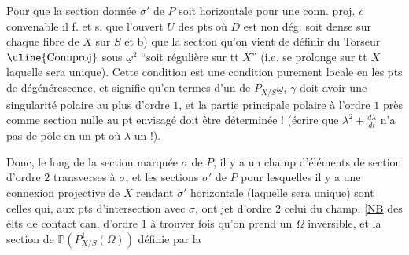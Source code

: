 Pour que la section donnée $\sigma'$ de $P$ soit horizontale pour une conn. proj. $c$ convenable il f. et s.  que l'ouvert $U$ des pts où $D$ est non dég. soit dense sur chaque fibre de $X$ sur $S$ et b) que la section qu'on vient de définir  du Torseur $\uline{\operatorname{Connproj}}$ sous $\underline{\omega}^2$  ``soit régulière sur tt $X$'' (i.e. se prolonge  sur tt $X$ laquelle sera unique). Cette condition est une condition purement locale en les pts de   dégénérescence, et signifie qu'en termes d'un  de $P^1_{X/S}\underline{\omega}$, $\gamma$  doit avoir une singularité polaire au plus d'ordre $1$, et la partie   principale polaire à l'ordre $1$ près comme section nulle au pt envisagé doit être déterminée ! (écrire que $\lambda^2+\frac{d\lambda}{dt}$ n'a pas de pôle en un pt où $\lambda$  un !).

Donc, le long de la section marquée $\sigma$ de $P$, il y a un champ d'éléments de section d'ordre $2$ transverses à $\sigma$, et les sections $\sigma'$ de $P$  pour lesquelles il y a une connexion projective de $X$ rendant $\sigma'$ horizontale (laquelle sera unique) sont celles qui, aux pts d'intersection avec $\sigma$, ont  jet d'ordre $2$ celui du champ. [\uline{NB} des élts de contact can. d'ordre $1$ à trouver  fois qu'on prend un $\Omega$ inversible, et la section de $\mathbb{P}(P^1_{X/S}(\Omega))$ définie par la
